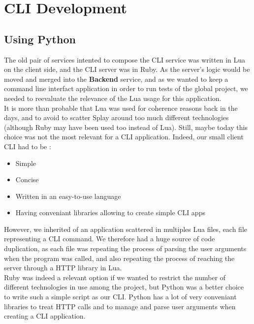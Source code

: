 \documentclass{eplmastersthesis}
\begin{document}
    \section{CLI Development}

      \subsection{Using Python}

        The old pair of services intented to compose the CLI service was
        written in Lua on the client side, and the CLI server was in Ruby. As
        the server's logic would be moved and merged into the \textbf{Backend}
        service, and as we wanted to keep a command line interfact application
        in order to run tests of the global project, we needed to reevaluate
        the relevance of the Lua usage for this application.\\

        It is more than probable that Lua was used for coherence reasons back
        in the days, and to avoid to scatter Splay around too much different
        technologies (although Ruby may have been used too instead of Lua).
        Still, maybe today this choice was not the most relevant for a CLI
        application. Indeed, our small client CLI had to be :

        \begin{itemize}
          \item Simple
          \item Concise
          \item Written in an easy-to-use language
          \item Having conveniant libraries allowing to create simple CLI apps
        \end{itemize}

        However, we inherited of an application scattered in multiples Lua
        files, each file representing a CLI command. We therefore had a huge
        source of code duplication, as each file was repeating the process
        of parsing the user arguments when the program was called, and also
        repeating the process of reaching the server through a HTTP library
        in Lua.\\
        Ruby was indeed a relevant option if we wanted to restrict the number
        of different technologies in use among the project, but Python was
        a better choice to write such a simple script as our CLI. Python has
        a lot of very conveniant libraries to treat HTTP calls and to
        manage and parse user arguments when creating a CLI application.
\end{document}
